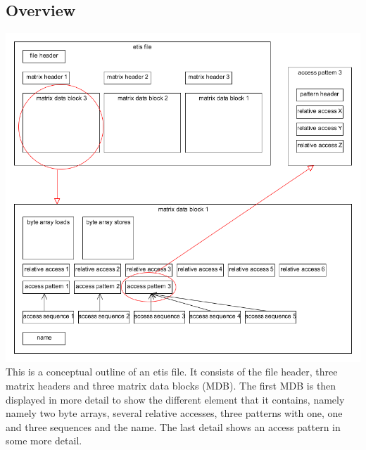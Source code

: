 \subsection{Overview}
\includegraphics[width=\textwidth]{fileformat/structure}
This is a conceptual outline of an etis file. It consists of the file header, three matrix headers and three matrix data blocks (MDB). The first MDB is then displayed in more detail to show the different element
that it contains, namely namely two byte arrays, several relative accesses, three patterns with one, one and three sequences and the name. The last detail shows an access pattern in some more detail.
